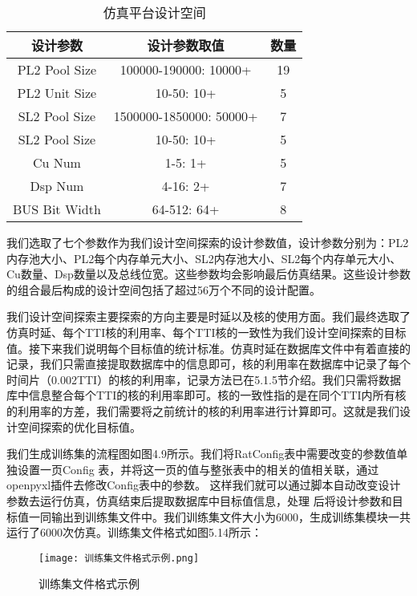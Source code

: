 \begin{table}[!h]
    \centering\normalsize
    \caption{仿真平台设计空间}
    \begin{tabular}{c|c|c}
    \hline
    \textbf{设计参数} & \textbf{设计参数取值}         & \textbf{数量} \\ \hline
    PL2 Pool Size & 100000-190000: 10000+   & 19          \\ \hline
    PL2 Unit Size & 10-50: 10+              & 5           \\ \hline
    SL2 Pool Size & 1500000-1850000: 50000+ & 7           \\ \hline
    SL2 Pool Size & 10-50: 10+              & 5           \\ \hline
    Cu Num        & 1-5: 1+                 & 5           \\ \hline
    Dsp Num       & 4-16: 2+                & 7           \\ \hline
    BUS Bit Width & 64-512: 64+             & 8           \\ \hline
    \end{tabular}
    \end{table}

我们选取了七个参数作为我们设计空间探索的设计参数值，设计参数分别为：PL2内存池大小、PL2每个内存单元大小、SL2内存池大小、SL2每个内存单元大小、Cu数量、Dsp数量以及总线位宽。这些参数均会影响最后仿真结果。这些设计参数的组合最后构成的设计空间包括了超过56万个不同的设计配置。

我们设计空间探索主要探索的方向主要是时延以及核的使用方面。我们最终选取了仿真时延、每个TTI核的利用率、每个TTI核的一致性为我们设计空间探索的目标值。接下来我们说明每个目标值的统计标准。仿真时延在数据库文件中有着直接的记录，我们只需直接提取数据库中的信息即可，核的利用率在数据库中记录了每个时间片（0.002TTI）的核的利用率，记录方法已在5.1.5节介绍。我们只需将数据库中信息整合每个TTI的核的利用率即可。核的一致性指的是在同个TTI内所有核的利用率的方差，我们需要将之前统计的核的利用率进行计算即可。这就是我们设计空间探索的优化目标值。

我们生成训练集的流程图如图4.9所示。我们将RatConfig表中需要改变的参数值单独设置一页Config
表，并将这一页的值与整张表中的相关的值相关联，通过openpyxl插件去修改Config表中的参数。
这样我们就可以通过脚本自动改变设计参数去运行仿真，仿真结束后提取数据库中目标值信息，处理
后将设计参数和目标值一同输出到训练集文件中。我们训练集文件大小为6000，生成训练集模块一共
运行了6000次仿真。训练集文件格式如图5.14所示：

\begin{figure}
    \centering
    \texttt{[image: 训练集文件格式示例.png]}
    \caption{训练集文件格式示例}
    \label{fig:badge}
\end{figure}

